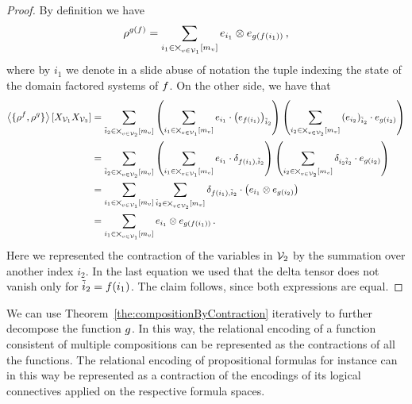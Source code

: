 \begin{proof}
	By definition we have
	\begin{align*}
		\rho^{g(f)} = \sum_{i_1 \in \bigtimes_{v\in\mathcal{V}_1} [m_{v}]} e_{i_1} \otimes e_{g(f(i_1))} \, ,
	\end{align*}
	where by $i_1$ we denote in a slide abuse of notation the tuple indexing the state of the domain factored systems of $f$.
	On the other side, we have that
	\begin{align*}
	 	\left\langle \{\rho^{f},\rho^{g}\}\right\rangle \left[ X_{\mathcal{V}_1}X_{\mathcal{V}_3} \right] 
		& =
		\sum_{\tilde{i}_2 \in \bigtimes_{v\in\mathcal{V}_2}[m_{v}]} 
		\left( \sum_{i_1 \in \bigtimes_{v\in\mathcal{V}_1}[m_{v}]}  e_{i_1} \cdot \left(e_{f(i_1)}\right)_{\tilde{i}_2} \right)
		\left( \sum_{i_2 \in \bigtimes_{v\in\mathcal{V}_2}[m_{v}]}  \left(e_{i_2}\right)_{\tilde{i}_2} \cdot e_{g(i_2)} \right) \\
		& = 
		\sum_{\tilde{i}_2 \in \bigtimes_{v\in\mathcal{V}_2}[m_{v}]} 
		\left( \sum_{i_1 \in \bigtimes_{v\in\mathcal{V}_1}[m_{v}]}  e_{i_1} \cdot \delta_{f(i_1),\tilde{i}_2} \right)
		\left( \sum_{i_2 \in \bigtimes_{v\in\mathcal{V}_2}[m_{v}]}  \delta_{i_2 \tilde{i}_2} \cdot e_{g(i_2)} \right) \\
		& = 
		\sum_{i_1 \in \bigtimes_{v\in\mathcal{V}_1}[m_{v}]}
		\sum_{\tilde{i}_2 \in \bigtimes_{v\in\mathcal{V}_2}[m_{v}]}  \delta_{f(i_1),\tilde{i}_2} \cdot \left(  e_{i_1}   \otimes e_{g(i_2)} \right) \\
		& = 
		\sum_{i_1 \in \bigtimes_{v\in\mathcal{V}_1} [m_{v}]} 
		e_{i_1} \otimes e_{g(f(i_1))} \, .
	\end{align*}
	Here we represented the contraction of the variables in $\mathcal{V}_2$ by the summation over another index $i_2$.
	In the last equation we used that the delta tensor does not vanish only for $\tilde{i}_2= f(i_1)$.
	The claim follows, since both expressions are equal.
\end{proof}

We can use Theorem~\ref{the:compositionByContraction} iteratively to further decompose the function $g$.
In this way, the relational encoding of a function consistent of multiple compositions can be represented as the contractions of all the functions.
The relational encoding of propositional formulas for instance can in this way be represented as a contraction of the encodings of its logical connectives applied on the respective formula spaces. 




